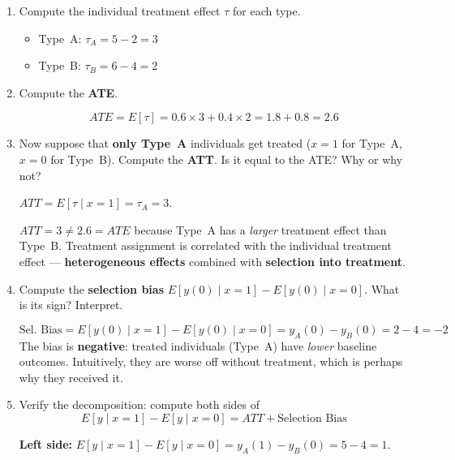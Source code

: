 \documentclass[11pt,a4paper]{article}
\begin{document}
\begin{enumerate}[label=(\alph*)]
\item Compute the individual treatment effect $\tau$ for each type.

\begin{solution}
\begin{itemize}
  \item Type~A: $\tau_A = 5 - 2 = 3$
  \item Type~B: $\tau_B = 6 - 4 = 2$
\end{itemize}
\end{solution}

\item Compute the \textbf{ATE}.

\begin{solution}
\[
  ATE = E[\tau] = 0.6 \times 3 + 0.4 \times 2 = 1.8 + 0.8 = \boxed{2.6}
\]
\end{solution}

\item Now suppose that \textbf{only Type~A} individuals get treated ($x = 1$ for Type~A, $x = 0$ for Type~B). Compute the \textbf{ATT}. Is it equal to the ATE? Why or why not?

\begin{solution}
$ATT = E[\tau \mid x = 1] = \tau_A = \boxed{3}$.

$ATT = 3 \neq 2.6 = ATE$ because Type~A has a \emph{larger} treatment effect than Type~B. Treatment assignment is correlated with the individual treatment effect --- \textbf{heterogeneous effects} combined with \textbf{selection into treatment}.
\end{solution}

\item Compute the \textbf{selection bias} $E[y(0) \mid x{=}1] - E[y(0) \mid x{=}0]$. What is its sign? Interpret.

\begin{solution}
\[
  \text{Sel.\ Bias} = E[y(0) \mid x{=}1] - E[y(0) \mid x{=}0] = y_A(0) - y_B(0) = 2 - 4 = \boxed{-2}
\]
The bias is \textbf{negative}: treated individuals (Type~A) have \emph{lower} baseline outcomes. Intuitively, they are worse off without treatment, which is perhaps why they received it.
\end{solution}

\item Verify the decomposition: compute both sides of
\[
  E[y \mid x{=}1] - E[y \mid x{=}0] = ATT + \text{Selection Bias}
\]

\begin{solution}
\textbf{Left side:} $E[y \mid x{=}1] - E[y \mid x{=}0] = y_A(1) - y_B(0) = 5 - 4 = 1$.


\end{solution}
\end{enumerate}
\end{document}
